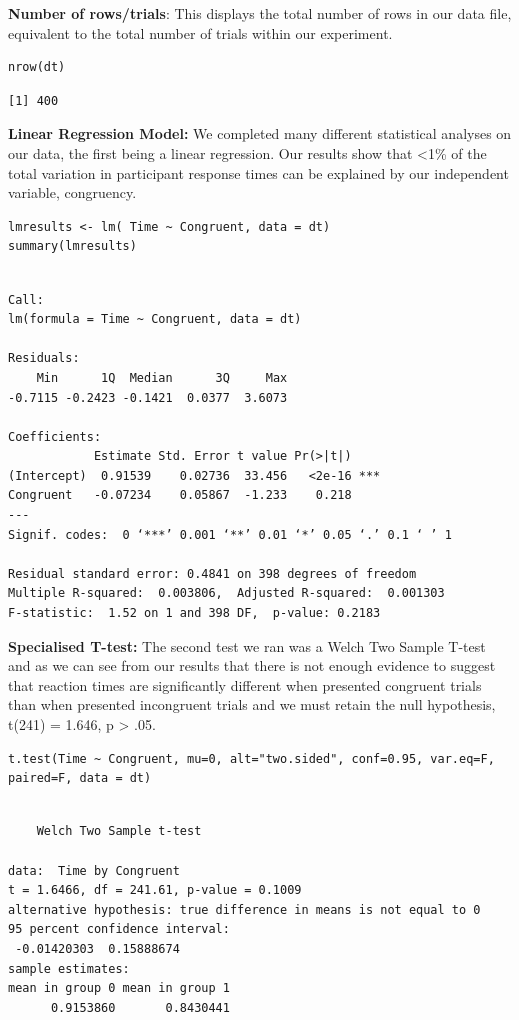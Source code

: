 \documentclass{article}
\begin{document}
\textbf{Number of rows/trials}: This displays the total number of rows in our data file, equivalent to the total number of trials within our experiment.
\begin{verbatim}
nrow(dt)
\end{verbatim}

\begin{verbatim}
[1] 400
\end{verbatim}


\vspace{2em} \textbf{Linear Regression Model:} We completed many different statistical analyses on our data, the first being a linear regression. Our results show that <1\% of the total variation in participant response times can be explained by our independent variable, congruency. 
\begin{verbatim}
lmresults <- lm( Time ~ Congruent, data = dt)
summary(lmresults)
\end{verbatim}

\begin{verbatim}

Call:
lm(formula = Time ~ Congruent, data = dt)

Residuals:
    Min      1Q  Median      3Q     Max 
-0.7115 -0.2423 -0.1421  0.0377  3.6073 

Coefficients:
            Estimate Std. Error t value Pr(>|t|)    
(Intercept)  0.91539    0.02736  33.456   <2e-16 ***
Congruent   -0.07234    0.05867  -1.233    0.218    
---
Signif. codes:  0 ‘***’ 0.001 ‘**’ 0.01 ‘*’ 0.05 ‘.’ 0.1 ‘ ’ 1

Residual standard error: 0.4841 on 398 degrees of freedom
Multiple R-squared:  0.003806,	Adjusted R-squared:  0.001303 
F-statistic:  1.52 on 1 and 398 DF,  p-value: 0.2183
\end{verbatim}

\vspace{2em} \textbf{Specialised T-test:} The second test we ran was a Welch Two Sample T-test and as we can see from our results that there is not enough evidence to suggest that reaction times are significantly different when presented congruent trials than when presented incongruent trials and we must retain the null hypothesis, t(241) = 1.646, p > .05.
\begin{verbatim}
t.test(Time ~ Congruent, mu=0, alt="two.sided", conf=0.95, var.eq=F, paired=F, data = dt)
\end{verbatim}

\begin{verbatim}

	Welch Two Sample t-test

data:  Time by Congruent
t = 1.6466, df = 241.61, p-value = 0.1009
alternative hypothesis: true difference in means is not equal to 0
95 percent confidence interval:
 -0.01420303  0.15888674
sample estimates:
mean in group 0 mean in group 1 
      0.9153860       0.8430441
\end{verbatim}
\end{document}

